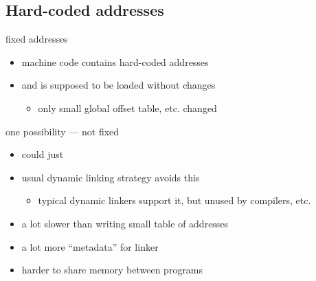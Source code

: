 \subsection{Hard-coded addresses}


\begin{frame}{fixed addresses}
    \begin{itemize}
    \item machine code contains hard-coded addresses
    \item and is supposed to be loaded without changes
        \begin{itemize}
        \item only small global offset table, etc. changed
        \end{itemize}
    \end{itemize}
\end{frame}

\begin{frame}{one possibility --- not fixed}
    \begin{itemize}
        \item could just 
        \item usual dynamic linking strategy avoids this
            \begin{itemize}
                \item typical dynamic linkers support it, but unused by compilers, etc.
            \end{itemize}
        \item a lot slower than writing small table of addresses
        \item a lot more ``metadata'' for linker
        \item harder to share memory between programs
    \end{itemize}
\end{frame}

